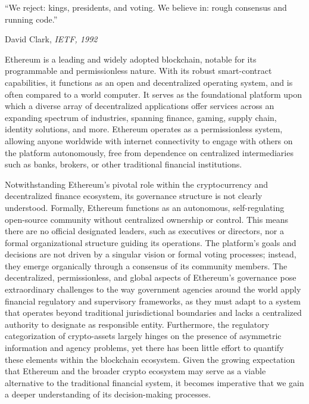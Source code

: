 \documentclass[No]{AEA}
\begin{document}
\setcounter{page}{1}
\doublespacing




\epigraph{``We reject: kings, presidents, and voting. We believe in: rough consensus and running code.''}{David Clark, \textit{IETF, 1992}}


Ethereum is a leading and widely adopted blockchain, notable for its programmable and permissionless nature. With its robust smart-contract capabilities, it functions as an open and decentralized operating system, and is often compared to a world computer. It serves as the foundational platform upon which a diverse array of decentralized applications offer services across an expanding spectrum of industries, spanning finance, gaming, supply chain, identity solutions, and more. Ethereum operates as a permissionless system, allowing anyone worldwide with internet connectivity to engage with others on the platform autonomously, free from dependence on centralized intermediaries such as banks, brokers, or other traditional financial institutions.

Notwithstanding Ethereum's pivotal role within the cryptocurrency and decentralized finance ecosystem, its governance structure is not clearly understood. Formally, Ethereum functions as an autonomous, self-regulating open-source community without centralized ownership or control. This means there are no official designated leaders, such as executives or directors, nor a formal organizational structure guiding its operations. The platform's goals and decisions are not driven by a singular vision or formal voting processes; instead, they emerge organically through a consensus of its community members. The decentralized, permissionless, and global aspects of Ethereum's governance pose extraordinary challenges to the way government agencies around the world apply financial regulatory and supervisory frameworks, as they must adapt to a system that operates beyond traditional jurisdictional boundaries and lacks a centralized authority to designate as responsible entity. Furthermore, the regulatory categorization of crypto-assets largely hinges on the presence of asymmetric information and agency problems, yet there has been little effort to quantify these elements within the blockchain ecosystem. Given the growing expectation that Ethereum and the broader crypto ecosystem may serve as a viable alternative to the traditional financial system, it becomes imperative that we gain a deeper understanding of its decision-making processes. 
\end{document}
